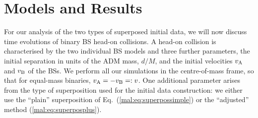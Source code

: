 
\section{Models and Results}
\label{mal:sec:results}
%
For our analysis of the two types of superposed initial data,
we will now discuss time evolutions of binary BS head-on collisions.
A head-on collision is characterised
by the two individual BS models and three further parameters,
the initial separation in units of the ADM mass,
$d/M$,
and the initial velocities $v_{\rm A}$ and
$v_{\rm B}$ of the BSs. We perform all our simulations in the centre-of-mass
frame, so that for equal-mass binaries, $v_{\rm A}=-v_{\rm B} =: v$.
One additional parameter arises from the type of superposition
used for the initial data construction: we either use the
``plain'' superposition of Eq.~(\ref{mal:eq:superpossimple}) or
the ``adjusted'' method (\ref{mal:eq:superposplus}).

